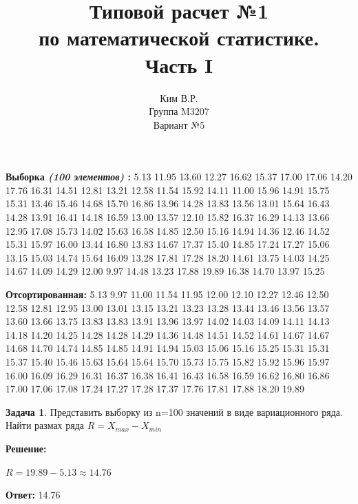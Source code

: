 \documentclass[a4paper,12pt]{article}
\title{Типовой расчет №1 \\ по математической статистике. \\ Часть I}
\author{Ким В.Р. \\ Группа M3207 \\ Вариант №5}
\date{}
\theoremstyle{definition}
\newtheorem{problem}{Задача}\setlength{\parindent}{0pt}
\newenvironment{solution}
{\begin{shaded}\textbf{Решение:}\par\setlength{\parindent}{0pt}}
{\end{shaded}}
\newenvironment{answer}
{\par\noindent\textbf{Ответ:} }
{\par}
\begin{document}
\maketitle

\par\noindent\textbf{Выборка \textit{(100 элементов)} :}
5.13 11.95 13.60 12.27 16.62 15.37 17.00 17.06 14.20 17.76 16.31 14.51 12.81 13.21 12.58
11.54 15.92 14.11 11.00 15.96 14.91 15.75 15.31 13.46 15.46 14.68 15.70 16.86 13.96 14.28
13.83 13.56 13.01 15.64 16.43 14.28 13.91 16.41 14.18 16.59 13.00 13.57 12.10 15.82 16.37
16.29 14.13 13.66 12.95 17.08 15.73 14.02 15.63 16.58 14.85 12.50 15.16 14.94 14.36 12.46
14.52 15.31 15.97 16.00 13.44 16.80 13.83 14.67 17.37 15.40 14.85 17.24 17.27 15.06 13.15
15.03 14.74 15.64 16.09 13.28 17.81 17.28 18.20 14.61 13.75 14.03 14.25 14.67 14.09 14.29
12.00 9.97 14.48 13.23 17.88 19.89 16.38 14.70 13.97 15.25
\\
\par\noindent\textbf{Отсортированная:}
5.13 9.97 11.00 11.54 11.95 12.00 12.10 12.27 12.46 12.50 12.58 12.81 12.95 13.00 13.01
13.15 13.21 13.23 13.28 13.44 13.46 13.56 13.57 13.60 13.66 13.75 13.83 13.83 13.91 13.96
13.97 14.02 14.03 14.09 14.11 14.13 14.18 14.20 14.25 14.28 14.28 14.29 14.36 14.48 14.51
14.52 14.61 14.67 14.67 14.68 14.70 14.74 14.85 14.85 14.91 14.94 15.03 15.06 15.16 15.25
15.31 15.31 15.37 15.40 15.46 15.63 15.64 15.64 15.70 15.73 15.75 15.82 15.92 15.96 15.97
16.00 16.09 16.29 16.31 16.37 16.38 16.41 16.43 16.58 16.59 16.62 16.80 16.86 17.00 17.06
17.08 17.24 17.27 17.28 17.37 17.76 17.81 17.88 18.20 19.89



\vspace{8pt}
\begin{problem}
    Представить выборку из n=100 значений в виде вариационного ряда. Найти
    размах ряда $R = X_{max} - X_{min}$
        \begin{solution}
            \( R = 19.89 - 5.13 \approx 14.76\)
        \end{solution}

        \begin{answer}
            14.76
        \end{answer}

    \end{problem}
\end{document}
